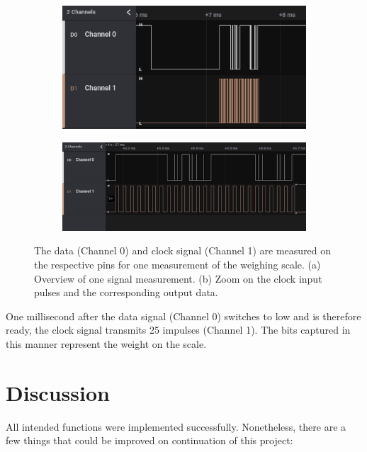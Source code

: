 \documentclass[twocolumn]{article}
\begin{document}
	\begin{figure}[H]
	\centering
		\begin{subfigure}[b]{\columnwidth}
			\centering
			\includegraphics[width=\columnwidth]{scale1.PNG}
			\caption{}
			\label{subfig4.1}
		\end{subfigure}
		
		\begin{subfigure}[b]{\columnwidth}
			\centering
			\includegraphics[width=\columnwidth]{scale2.PNG}
			\caption{}
			\label{subfig4.2}
		\end{subfigure}
		\caption{The data (Channel 0) and clock signal (Channel 1) are measured on the respective pins for one measurement of the weighing scale. (a) Overview of one signal measurement. (b) Zoom on the clock input pulses and the corresponding output data.}
		\label{fig4}
	\end{figure}
	
	One millisecond after the data signal (Channel 0) switches to low and is therefore ready, the clock signal transmits 25 impulses (Channel 1). The bits captured in this manner represent the weight on the scale. 
	
	\newpage
	\vspace*{40px}
	
	\section{Discussion}
	All intended functions were implemented successfully. Nonetheless, there are a few things that could be improved on continuation of this project:
	
\end{document}
